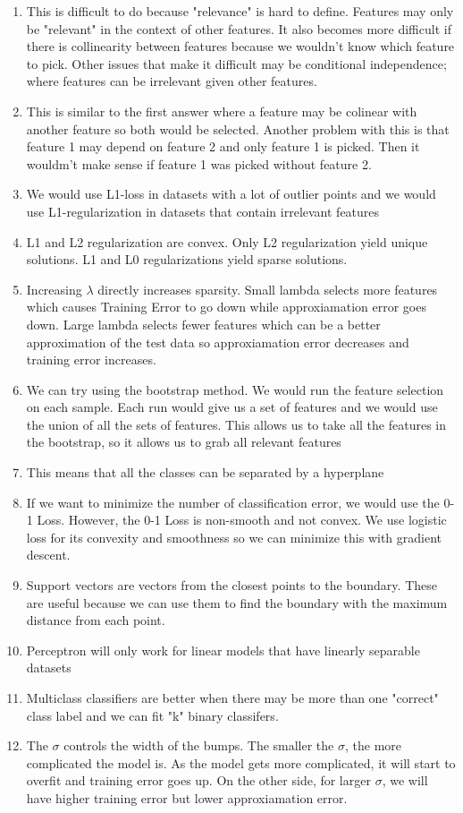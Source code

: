 \documentclass{article}
\def\enum#1{\begin{enumerate}#1\end{enumerate}}
\begin{document}
\enum{
\item This is difficult to do because "relevance" is hard to define. Features may only be "relevant" in the context of
other features. It also becomes more difficult if there is collinearity between features because we wouldn't know which
feature to pick. Other issues that make it difficult may be conditional independence; where features can be irrelevant 
given other features.
\item This is similar to the first answer where a feature may be colinear with another feature so both would be selected.
Another problem with this is that feature 1 may depend on feature 2 and only feature 1 is picked. Then it wouldm't make 
sense if feature 1 was picked without feature 2.
\item We would use L1-loss in datasets with a lot of outlier points and we would use L1-regularization in datasets that 
contain irrelevant features 
\item L1 and L2 regularization are convex. Only L2 regularization yield unique solutions. L1 and L0 regularizations yield
sparse solutions. 
\item Increasing $\lambda$ directly increases sparsity. Small lambda selects more features which causes Training Error to 
go down while approxiamation error goes down. Large lambda selects fewer features which can be a better approximation of the test data so approxiamation error
decreases and training error increases. 
\item We can try using the bootstrap method. We would run the feature selection on each sample. Each run would give us a set 
of features and we would use the union of all the sets of features. This allows us to take all the features in the bootstrap, so it allows us
to grab all relevant features
\item This means that all the classes can be separated by a hyperplane
\item If we want to minimize the number of classification error, we would use the 0-1 Loss. However, the 0-1 Loss is non-smooth
and not convex. We use logistic loss for its convexity and smoothness so we can minimize this with gradient descent.
\item Support vectors are vectors from the closest points to the boundary. These are useful because we can use them to find the boundary
with the maximum distance from each point. 
\item Perceptron will only work for linear models that have linearly separable datasets
\item Multiclass classifiers are better when there may be more than one "correct" class label and we can fit "k" binary classifers.
\item The $\sigma$ controls the width of the bumps. The smaller the $\sigma$, the more complicated the model is. As the model gets 
more complicated, it will start to overfit and training error goes up. On the other side, for larger $\sigma$, we will have higher
training error but lower approxiamation error.
}
\end{document}
